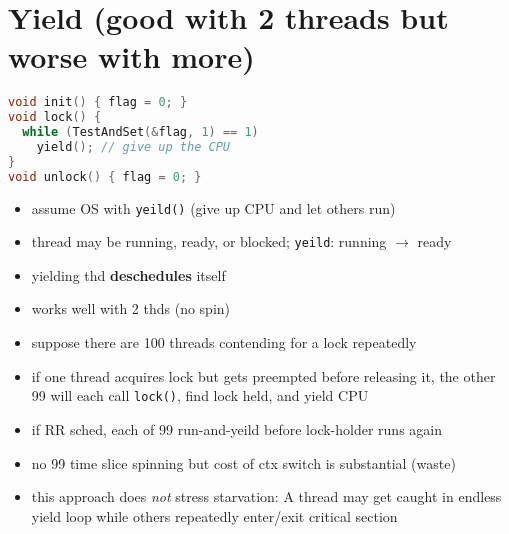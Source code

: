 \section*{Yield (good with 2 threads but worse with more)}
\begin{minipage}{.5\linewidth}
\begin{lstlisting}[language=c]
void init() { flag = 0; }
void lock() {
  while (TestAndSet(&flag, 1) == 1)
    yield(); // give up the CPU
}
void unlock() { flag = 0; }
\end{lstlisting}
\end{minipage}
\begin{minipage}{.5\linewidth}
  \flushleft
  \begin{itemize}
  \item assume OS with \texttt{yeild()} (give up CPU and let others run)
  \item thread may be running, ready, or blocked; \texttt{yeild}: running $\to$ ready
  \item yielding thd \textbf{deschedules} itself
  \item works well with 2 thds (no spin)
  \end{itemize}
\end{minipage}
\begin{itemize}
\item suppose there are 100 threads contending for a lock repeatedly
\item if one thread acquires lock but gets preempted before releasing it, the other 99 will each call \texttt{lock()}, find lock held, and yield CPU
\item if RR sched, each of 99 run-and-yeild before lock-holder runs again
\item no 99 time slice spinning but cost of ctx switch is substantial (waste)
\item this approach does \emph{not} stress starvation: A thread may get
caught in endless yield loop while others repeatedly enter/exit critical section
\end{itemize}
